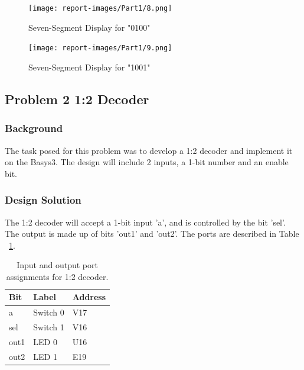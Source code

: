 \documentclass[11pt]{article}
\begin{document}
\begin{figure}[H]
\begin{center}
\texttt{[image: report-images/Part1/8.png]}
\caption{Seven-Segment Display for "0100"}
\label{fig:sevenSegEight}
\end{center}
\end{figure}

\begin{figure}[H]
\begin{center}
\texttt{[image: report-images/Part1/9.png]}
\caption{\label{fig: fig-name} Seven-Segment Display for "1001"}
\label{fig:sevenSegNine}
\end{center}
\end{figure}

\pagebreak

\subsection{Problem 2 1:2 Decoder}

\subsubsection{Background}
The task posed for this problem was to develop a 1:2 decoder and implement it on the Basys3. The design will include 2 inputs, a 1-bit number and an enable bit.

\subsubsection{Design Solution}
The 1:2 decoder will accept a 1-bit input 'a', and is controlled by the bit 'sel'. The output is made up of bits 'out1' and 'out2'. The ports are described in Table ~\ref{tab:decoderPort}.

\begin{table}[h]
\begin{center}
		\begin{tabular}{| l | l | l |}
			\hline
			Bit & Label & Address \\ \hline
			a & Switch 0 & V17 \\ \hline
			sel & Switch 1 & V16 \\ \hline
			out1 & LED 0 & U16 \\ \hline
			out2 & LED 1 & E19 \\ \hline
		\end{tabular}
		\caption{\label{tab: tab-name} Input and output port assignments for 1:2 decoder.}
		\label{tab:decoderPort}
\end{center}
\end{table}
\end{document}
